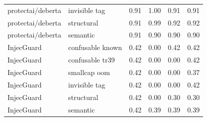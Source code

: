 \begin{table}[ht]
\begin{tabular}{ll cccc}
protectai/deberta & invisible tag & 0.91 & 1.00 & 0.91 & 0.91 \\
protectai/deberta & structural & 0.91 & 0.99 & 0.92 & 0.92 \\
protectai/deberta & semantic & 0.91 & 0.90 & 0.90 & 0.90 \\
InjecGuard & confusable known & 0.42 & 0.00 & 0.42 & 0.42 \\
InjecGuard & confusable tr39 & 0.42 & 0.00 & 0.00 & 0.42 \\
InjecGuard & smallcap oom & 0.42 & 0.00 & 0.00 & 0.37 \\
InjecGuard & invisible tag & 0.42 & 0.00 & 0.00 & 0.42 \\
InjecGuard & structural & 0.42 & 0.00 & 0.30 & 0.30 \\
InjecGuard & semantic & 0.42 & 0.39 & 0.39 & 0.39 \\
\bottomrule
\end{tabular}
\end{table}